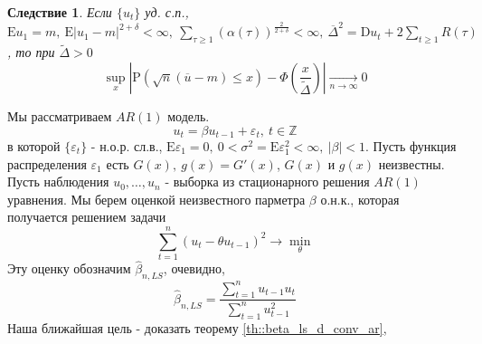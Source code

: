 \documentclass[12pt]{article}
\newtheorem*{corollary}{Следствие}
\def\eps{ \varepsilon }
\def\Z{ \mathbb{Z} }
\def\E{ \mathrm{E} }
\def\D{ \mathrm{D} }
\def\P{ \mathrm{P} }
\begin{document}
\begin{corollary}
    Если $\{u_t\}$ уд. с.п., $\E u_1=m,\ \E\left\lvert u_1-m\right\rvert ^{2+\delta}<\infty,\ \sum_{\tau\geq1}(\alpha(\tau))^{\frac{2}{2+\delta}}<\infty,\ \overline{\Delta}^2=\D u_t+2\sum_{t\geq1}R(\tau)$,
    то при  $\widetilde{\Delta}>0$
    \[\sup_{x}\left\lvert \P(\sqrt{n}(\overline{u}-m)\leq x)-\Phi\left(\frac{x}{\widetilde{\Delta}}\right)\right\rvert \underset{n\rightarrow\infty}{\rightarrow}0\]
\end{corollary}

\newpage
Мы рассматриваем $AR(1)$ модель.
\begin{equation} \label{eq::new_ar_equation}
    u_t=\beta u_{t-1}+\eps_t,\ t\in\Z
\end{equation}
в которой $\{\eps_t\}$ - н.о.р. сл.в., $\E\eps_1=0,\ 0<\sigma^2=\E\eps_1^2<\infty,\ \left\lvert \beta\right\rvert <1$.
Пусть функция распределения $\eps_1$ есть $G(x),\ g(x)=G'(x)$, $G(x)$ и $g(x)$ неизвестны.
Пусть наблюдения $u_0,\ldots,u_n$ - выборка из стационарного решения $AR(1)$ уравнения.
Мы берем оценкой неизвестного парметра $\beta$ о.н.к., которая получается решением задачи
\[\sum_{t=1}^n(u_t-\theta u_{t-1})^2\rightarrow\min_{\theta}\]
Эту оценку обозначим $\widehat{\beta}_{n,LS}$, очевидно,
\begin{equation} \label{eq::ls_frac_repr} \tag{18'}
    \widehat{\beta}_{n,LS}=\frac{\sum_{t=1}^nu_{t-1}u_t}{\sum_{t=1}^nu_{t-1}^2}
\end{equation}
Наша ближайшая цель - доказать теорему \ref{th::beta_ls_d_conv_ar},
\end{document}
